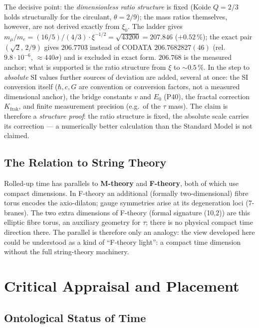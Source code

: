 The decisive point: the \emph{dimensionless ratio structure} is fixed (Koide $Q=2/3$ holds structurally for the circulant, $\theta=2/9$); the mass ratios themselves, however, are not derived exactly from $\xi_0$. The ladder gives $m_\mu/m_e=(16/5)/(4/3)\cdot\xi^{-1/2}=\sqrt{43200}=207.846$ ($+0.52\,\%$); the exact pair $(\sqrt2,\,2/9)$ gives $206.7703$ instead of CODATA $206.7682827(46)$ (rel.\ $9.8\cdot10^{-6}$, ${\approx}440\sigma$) and is excluded in exact form. $206.768$ is the measured anchor; what is supported is the ratio structure from $\xi$ to ${\sim}0.5\,\%$. In the step to \emph{absolute} SI values further sources of deviation are added, several at once: the SI conversion itself ($\hbar,c,G$ are convention or conversion factors, not a measured dimensional anchor), the bridge constants $v$ and $E_0$ (P40), the fractal correction $K_{\text{frak}}$, and finite measurement precision (e.g.\ of the $\tau$ mass). The claim is therefore a \emph{structure proof}: the ratio structure is fixed, the absolute scale carries its correction --- a numerically better calculation than the Standard Model is not claimed.

\subsection{The Relation to String Theory}

Rolled-up time has parallels to \textbf{M-theory} and \textbf{F-theory}, both of which use compact dimensions. In F-theory an additional (formally two-dimensional) fibre torus encodes the axio-dilaton; gauge symmetries arise at its degeneration loci (7-branes). The two extra dimensions of F-theory (formal signature (10,2)) are this elliptic fibre torus, an auxiliary geometry for $\tau$; there is no physical compact time direction there. The parallel is therefore only an analogy: the view developed here could be understood as a kind of ``F-theory light'': a compact time dimension without the full string-theory machinery.

\section{Critical Appraisal and Placement}

\subsection{Ontological Status of Time}

